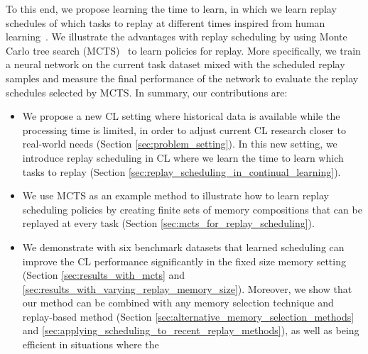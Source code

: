 To this end, we propose learning the time to learn, in which we learn replay schedules of which tasks to replay at different times inspired from human learning~\citep{dempster1989spacing}. 
We illustrate the advantages with replay scheduling by using Monte Carlo tree search (MCTS)~\citep{coulom2006efficient} to learn policies for replay. 
More specifically, we train a neural network on the current task dataset mixed with the scheduled replay samples and measure the final performance of the network to evaluate the replay schedules selected by MCTS. 
In summary, our contributions are:
\begin{itemize}[topsep=1pt,] %
    \setlength\itemsep{0.1mm}
    \item We propose a new CL setting where historical data is available while the processing time is limited, in order to adjust current CL research closer to real-world needs (Section \ref{sec:problem_setting}). In this new setting, we introduce replay scheduling in CL where we learn the time to learn which tasks to replay (Section \ref{sec:replay_scheduling_in_continual_learning}).
    \item We use MCTS as an example method to illustrate how to learn replay scheduling policies by creating finite sets of memory compositions that can be replayed at every task (Section \ref{sec:mcts_for_replay_scheduling}).
    \item We demonstrate with six benchmark datasets that learned scheduling can improve the CL performance significantly in the fixed size memory setting (Section \ref{sec:results_with_mcts} and \ref{sec:results_with_varying_replay_memory_size}). Moreover, we show that our method can be combined with any memory selection technique and replay-based method (Section \ref{sec:alternative_memory_selection_methods} and \ref{sec:applying_scheduling_to_recent_replay_methods}), as well as being efficient in situations where the 

\end{itemize}
